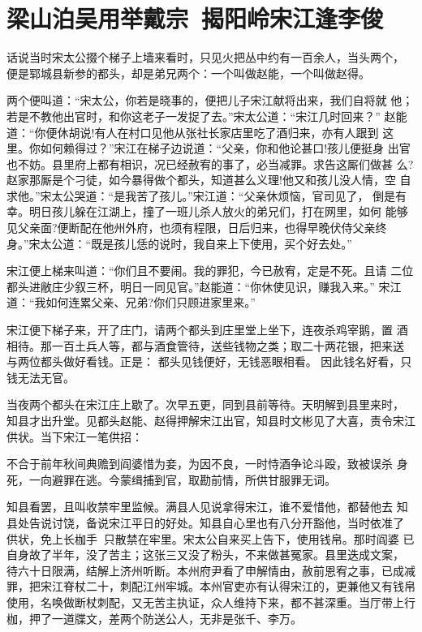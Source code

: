 \chapter{梁山泊吴用举戴宗~揭阳岭宋江逢李俊}

话说当时宋太公掇个梯子上墙来看时，只见火把丛中约有一百余人，当头两个，
便是郓城县新参的都头，却是弟兄两个：一个叫做赵能，一个叫做赵得。

两个便叫道：“宋太公，你若是晓事的，便把儿子宋江献将出来，我们自将就
他；若是不教他出官时，和你这老子一发捉了去。”宋太公道：“宋江几时回来？”
赵能道：“你便休胡说!有人在村口见他从张社长家店里吃了酒归来，亦有人跟到
这里。你如何赖得过？”宋江在梯子边说道：“父亲，你和他论甚口!孩儿便挺身
出官也不妨。县里府上都有相识，况已经赦宥的事了，必当减罪。求告这厮们做甚
么?赵家那厮是个刁徒，如今暴得做个都头，知道甚么义理!他又和孩儿没人情，空
自求他。”宋太公哭道：“是我苦了孩儿。”宋江道：“父亲休烦恼，官司见了，
倒是有幸。明日孩儿躲在江湖上，撞了一班儿杀人放火的弟兄们，打在网里，如何
能够见父亲面?便断配在他州外府，也须有程限，日后归来，也得早晚伏侍父亲终
身。”宋太公道：“既是孩儿恁的说时，我自来上下使用，买个好去处。”

宋江便上梯来叫道：“你们且不要闹。我的罪犯，今已赦宥，定是不死。且请
二位都头进敝庄少叙三杯，明日一同见官。”赵能道：“你休使见识，赚我入来。”
宋江道：“我如何连累父亲、兄弟?你们只顾进家里来。”

宋江便下梯子来，开了庄门，请两个都头到庄里堂上坐下，连夜杀鸡宰鹅，置
酒相待。那一百土兵人等，都与酒食管待，送些钱物之类；取二十两花银，把来送
与两位都头做好看钱。正是：
都头见钱便好，无钱恶眼相看。
因此钱名好看，只钱无法无官。

当夜两个都头在宋江庄上歇了。次早五更，同到县前等待。天明解到县里来时，
知县才出升堂。见都头赵能、赵得押解宋江出官，知县时文彬见了大喜，责令宋江
供状。当下宋江一笔供招：

不合于前年秋间典赡到阎婆惜为妾，为因不良，一时恃酒争论斗殴，致被误杀
身死，一向避罪在逃。今蒙缉捕到官，取勘前情，所供甘服罪无词。

知县看罢，且叫收禁牢里监候。满县人见说拿得宋江，谁不爱惜他，都替他去
知县处告说讨饶，备说宋江平日的好处。知县自心里也有八分开豁他，当时依准了
供状，免上长枷手，只散禁在牢里。宋太公自来买上告下，使用钱帛。那时阎婆
已自身故了半年，没了苦主；这张三又没了粉头，不来做甚冤家。县里迭成文案，
待六十日限满，结解上济州听断。本州府尹看了申解情由，赦前恩宥之事，已成减
罪，把宋江脊杖二十，刺配江州牢城。本州官吏亦有认得宋江的，更兼他又有钱帛
使用，名唤做断杖刺配，又无苦主执证，众人维持下来，都不甚深重。当厅带上行
枷，押了一道牒文，差两个防送公人，无非是张千、李万。

